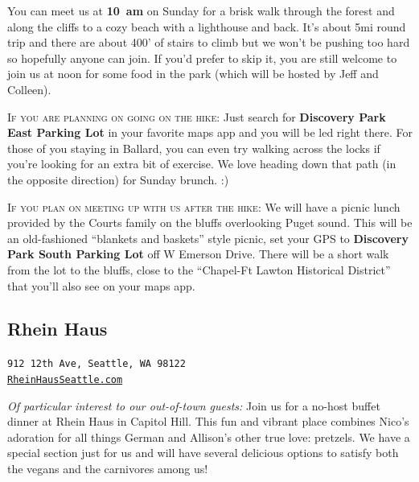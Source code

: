 \documentclass[10pt]{article}
\begin{document}
You can meet us at \textbf{10~am} on Sunday for a brisk walk through the forest and along the cliffs
to a cozy beach with a lighthouse and back. It's about 5mi round trip and there are about 400' of stairs
to climb but we won't be pushing too hard so hopefully anyone can join. If you'd prefer to skip it, you are 
still welcome to join us at noon for some food in the park (which will be hosted by Jeff and Colleen).

\textsc{If you are planning on going on the hike:} Just search for \textbf{Discovery Park East Parking Lot} in your favorite maps app and you will be led right there. For those of you
staying in Ballard, you can even try walking across the locks if you're looking for an extra bit of exercise. We love heading
down that path (in the opposite direction) for Sunday brunch. :)

\textsc{If you plan on meeting up with us after the hike:} We will have a picnic lunch provided by the Courts family 
on the bluffs overlooking Puget sound. This will be an old-fashioned ``blankets and baskets'' style picnic, set your GPS 
to \textbf{Discovery Park South Parking Lot} off W Emerson Drive. There will be a short walk from the lot to the bluffs, 
close to the ``Chapel-Ft Lawton Historical District'' that you'll also see on your maps app.

\subsection{Rhein Haus}
\label{subsec-rheinhaus}
\begin{center}
    \texttt{912 12th Ave, Seattle, WA 98122\\\href{https://www.rheinhausseattle.com/}{RheinHausSeattle.com}}
\end{center}

\textit{Of particular interest to our out-of-town guests:} Join us for a no-host buffet dinner at Rhein Haus in Capitol Hill. This fun and vibrant place combines Nico's 
adoration for all things German and Allison's other true love: pretzels. We have a special section just for us 
and will have several delicious options to satisfy both the vegans and the carnivores among us! 
\end{document}
